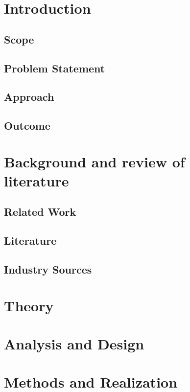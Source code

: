 
\chapter{Introduction}
\section{Scope}
\section{Problem Statement}
\section{Approach}
\section{Outcome}

\chapter{Background and review of literature}
\section{Related Work}
\section{Literature}
\section{Industry Sources}


\chapter{Theory}


\chapter{Analysis and Design}


\chapter{Methods and Realization}

